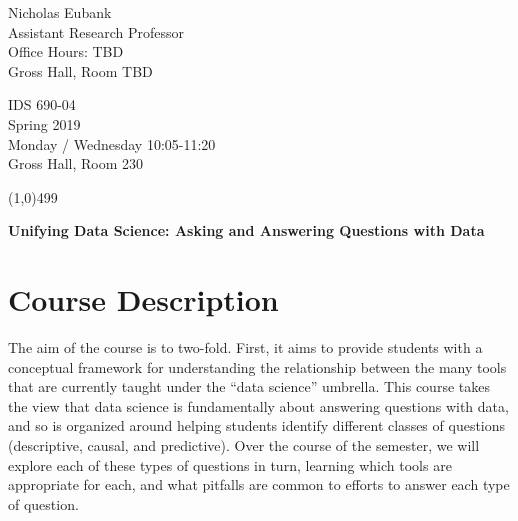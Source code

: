 \documentclass[12pt]{article}
\begin{document}
\singlespacing






\thispagestyle{empty}
\begin{minipage}[t]{.5\textwidth}
	Nicholas Eubank \\
	 Assistant Research Professor\\
	 Office Hours: TBD\\
	 Gross Hall, Room TBD
     \vspace*{0.1cm}
\end{minipage}
\begin{minipage}[t]{.5\textwidth}
	\begin{flushright}  IDS 690-04\\
	Spring 2019\\
	Monday / Wednesday 10:05-11:20 \\
	Gross Hall, Room 230
    \vspace*{0.1cm}
\end{flushright}
\end{minipage}


\line(1,0){499}

\vspace{.35in}

\begin{center}
	\textbf{\LARGE{Unifying Data Science: Asking and Answering Questions with Data} }
\end{center}








\section{Course Description}

The aim of the course is to two-fold. First, it aims to provide students with a conceptual framework for understanding the relationship between the many tools that are currently taught under the ``data science'' umbrella. This course takes the view that data science is fundamentally about answering questions with data, and so is organized around helping students identify different classes of questions (descriptive, causal, and predictive). Over the course of the semester, we will explore each of these types of questions in turn, learning which tools are appropriate for each, and what pitfalls are common to efforts to answer each type of question.
\end{document}
